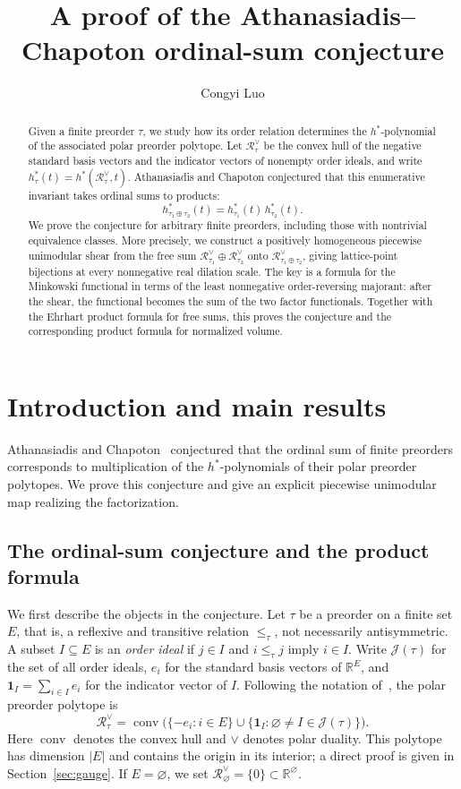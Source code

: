 \documentclass[11pt,reqno]{amsart}
\title[The Athanasiadis--Chapoton ordinal-sum conjecture]{A proof of the Athanasiadis--Chapoton ordinal-sum conjecture}
\author{Congyi Luo}
\date{}
\numberwithin{equation}{section}
\theoremstyle{definition}
\theoremstyle{remark}
\theoremstyle{definition}
\newcommand{\Rpoly}[1]{\mathcal R_{#1}^{\vee}}
\DeclareMathOperator{\conv}{conv}
\begin{document}
\begin{abstract}
Given a finite preorder $\tau$, we study how its order relation determines the $h^*$-polynomial of the associated polar preorder polytope. Let $\Rpoly{\tau}$ be the convex hull of the negative standard basis vectors and the indicator vectors of nonempty order ideals, and write $h_\tau^*(t)=h^*(\Rpoly{\tau},t)$. Athanasiadis and Chapoton conjectured that this enumerative invariant takes ordinal sums to products:
\[
 h_{\tau_1\oplus\tau_2}^*(t)=h_{\tau_1}^*(t)\,h_{\tau_2}^*(t).
\]
We prove the conjecture for arbitrary finite preorders, including those with nontrivial equivalence classes. More precisely, we construct a positively homogeneous piecewise unimodular shear from the free sum $\Rpoly{\tau_1}\oplus\Rpoly{\tau_2}$ onto $\Rpoly{\tau_1\oplus\tau_2}$, giving lattice-point bijections at every nonnegative real dilation scale. The key is a formula for the Minkowski functional in terms of the least nonnegative order-reversing majorant: after the shear, the functional becomes the sum of the two factor functionals. Together with the Ehrhart product formula for free sums, this proves the conjecture and the corresponding product formula for normalized volume.
\end{abstract}
\maketitle
\section{Introduction and main results}
Athanasiadis and Chapoton~\cite[Conjecture~6.3]{AC} conjectured that the ordinal sum of finite preorders corresponds to multiplication of the $h^*$-polynomials of their polar preorder polytopes. We prove this conjecture and give an explicit piecewise unimodular map realizing the factorization.

\subsection{The ordinal-sum conjecture and the product formula}
We first describe the objects in the conjecture. Let $\tau$ be a preorder on a finite set $E$, that is, a reflexive and transitive relation $\le_\tau$, not necessarily antisymmetric. A subset $I\subseteq E$ is an \emph{order ideal} if $j\in I$ and $i\le_\tau j$ imply $i\in I$. Write $\mathcal J(\tau)$ for the set of all order ideals, $e_i$ for the standard basis vectors of $\mathbb R^E$, and $\mathbf1_I=\sum_{i\in I}e_i$ for the indicator vector of $I$. Following the notation of~\cite[Section~6]{AC}, the polar preorder polytope is
\begin{equation}\label{polytope}
 \Rpoly{\tau}
 =\conv\bigl(\{-e_i:i\in E\}\cup
       \{\mathbf1_I:\varnothing\ne I\in\mathcal J(\tau)\}\bigr).
\end{equation}
Here $\conv$ denotes the convex hull and $\vee$ denotes polar duality. This polytope has dimension $|E|$ and contains the origin in its interior; a direct proof is given in Section~\ref{sec:gauge}. If $E=\varnothing$, we set $\Rpoly{\varnothing}=\{0\}\subset\mathbb R^\varnothing$.
\end{document}
